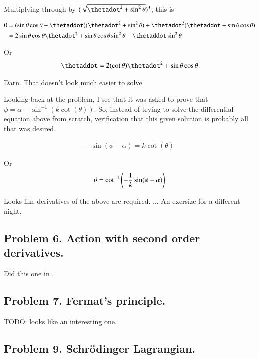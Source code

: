 \documentclass{article}
\begin{document}
Multiplying through by $(\sqrt{\thetadot^2 + \sin^2\theta })^3$, this is

\begin{align*}
0 
&= (\sin\theta \cos\theta - \thetaddot) ( \thetadot^2 + \sin^2\theta ) + \thetadot^2( \thetaddot + \sin\theta\cos\theta )  \\
&= 
2 \sin\theta \cos\theta \thetadot^2 
+ \sin\theta \cos\theta \sin^2\theta 
- \thetaddot \sin^2\theta  
\\
\end{align*}

Or
\begin{align*}
\thetaddot =
2 (\cot\theta) \thetadot^2 
+ \sin\theta \cos\theta 
\end{align*}

Darn.  That doesn't look much easier to solve.

Looking back at the problem, I see that it was asked to prove that $\phi = \alpha - \sin^{-1}(k\cot(\theta))$.  So, instead of trying to solve
the differential equation above from scratch, verification that this given solution is probably all that was desired.

\begin{align*}
-\sin(\phi - \alpha) = k\cot(\theta)
\end{align*}

Or
\begin{align*}
\theta = \cot^{-1}\left(-\frac{1}{k} \sin(\phi - \alpha)\right)
\end{align*}

Looks like derivatives of the above are required. ... An exersize for a different night.

\subsection{ Problem 6.  Action with second order derivatives. }

Did this one in \cite{PJgoldch1}.

\subsection{ Problem 7.  Fermat's principle. }

TODO: looks like an interesting one.

\subsection{ Problem 9.  Schr\"{o}dinger Lagrangian. }
\end{document}

